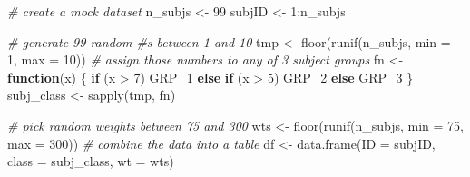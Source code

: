 \documentclass[smallextended]{svjour3}       %
\newenvironment{Shaded}{\begin{snugshade}}{\end{snugshade}}
\newcommand{\AttributeTok}[1]{\textcolor[rgb]{0.77,0.63,0.00}{#1}}
\newcommand{\CommentTok}[1]{\textcolor[rgb]{0.56,0.35,0.01}{\textit{#1}}}
\newcommand{\ControlFlowTok}[1]{\textcolor[rgb]{0.13,0.29,0.53}{\textbf{#1}}}
\newcommand{\DecValTok}[1]{\textcolor[rgb]{0.00,0.00,0.81}{#1}}
\newcommand{\FunctionTok}[1]{\textcolor[rgb]{0.00,0.00,0.00}{#1}}
\newcommand{\NormalTok}[1]{#1}
\newcommand{\OtherTok}[1]{\textcolor[rgb]{0.56,0.35,0.01}{#1}}
\newcommand{\SpecialCharTok}[1]{\textcolor[rgb]{0.00,0.00,0.00}{#1}}
\newcommand{\StringTok}[1]{\textcolor[rgb]{0.31,0.60,0.02}{#1}}
\begin{document}
\begin{Shaded}
\begin{Highlighting}[]
\CommentTok{\# create a mock dataset}
\NormalTok{n\_subjs }\OtherTok{\textless{}{-}} \DecValTok{99}
\NormalTok{subjID }\OtherTok{\textless{}{-}} \DecValTok{1}\SpecialCharTok{:}\NormalTok{n\_subjs}

\CommentTok{\# generate 99 random \#s between 1 and 10}
\NormalTok{tmp }\OtherTok{\textless{}{-}} \FunctionTok{floor}\NormalTok{(}\FunctionTok{runif}\NormalTok{(n\_subjs, }\AttributeTok{min =} \DecValTok{1}\NormalTok{, }\AttributeTok{max =} \DecValTok{10}\NormalTok{))}
\CommentTok{\# assign those numbers to any of 3 subject groups}
\NormalTok{fn }\OtherTok{\textless{}{-}} \ControlFlowTok{function}\NormalTok{(x) \{ }
  \ControlFlowTok{if}\NormalTok{ (x }\SpecialCharTok{\textgreater{}} \DecValTok{7}\NormalTok{) }\StringTok{\textquotesingle{}GRP\_1\textquotesingle{}} 
  \ControlFlowTok{else} \ControlFlowTok{if}\NormalTok{ (x }\SpecialCharTok{\textgreater{}} \DecValTok{5}\NormalTok{) }\StringTok{\textquotesingle{}GRP\_2\textquotesingle{}} 
  \ControlFlowTok{else} \StringTok{\textquotesingle{}GRP\_3\textquotesingle{}} 
\NormalTok{\}}
\NormalTok{subj\_class }\OtherTok{\textless{}{-}} \FunctionTok{sapply}\NormalTok{(tmp, fn)}

\CommentTok{\# pick random weights between 75 and 300}
\NormalTok{wts }\OtherTok{\textless{}{-}} \FunctionTok{floor}\NormalTok{(}\FunctionTok{runif}\NormalTok{(n\_subjs, }\AttributeTok{min =} \DecValTok{75}\NormalTok{, }\AttributeTok{max =} \DecValTok{300}\NormalTok{))}
\CommentTok{\# combine the data into a table}
\NormalTok{df }\OtherTok{\textless{}{-}} \FunctionTok{data.frame}\NormalTok{(}\AttributeTok{ID =}\NormalTok{ subjID, }\AttributeTok{class =}\NormalTok{ subj\_class, }\AttributeTok{wt =}\NormalTok{ wts)}


\end{Highlighting}
\end{Shaded}
\end{document}
